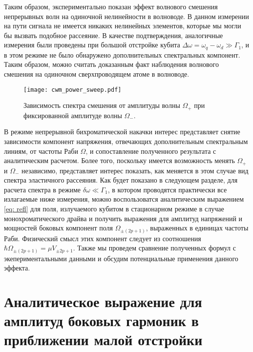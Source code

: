 Таким образом, экспериментально показан эффект волнового смешения непрерывных волн на одиночной нелинейности в волноводе. В данном измерении на пути сигнала не имеется никаких нелинейных элементов, которые мы могли бы вызвать подобное рассеяние. В качестве подтверждения, аналогичные измерения были проведены при большой отстройке кубита $\Delta\omega = \omega_q - \omega_d \gg \Gamma_1 $, и в этом режиме не было обнаружено дополнительных спектральных компонент. Таким образом, можно считать доказанным факт наблюдения волнового смешения на одиночном сверхпроводящем атоме в волноводе.  
\begin{figure}
	\centering
	\texttt{[image: cwm\_power\_sweep.pdf]}
	\caption[Зависимость спектра смешения от амплитуды волны $\Omega_+$ при фиксированной амплитуде волны $\Omega_-$. ]{Зависимость спектра смешения от амплитуды волны $\Omega_+$ при фиксированной амплитуде волны $\Omega_-$.}
	\label{fig: cw_power_sweep}
\end{figure}
В режиме непрерывной бихроматической накачки интерес представляет снятие зависимости компонент напряжения, отвечающих дополнительным спектральным линиям, от частоты Раби $\Omega$, и сопоставление  полученного результата с аналитическим расчетом. Более того, поскольку имеется возможность менять $\Omega_+$ и $\Omega_-$ независимо, представляет интерес показать, как меняется в этом случае вид спектра эластичного рассеяния. Как будет показано в следующем разделе, для расчета спектра в режиме $\delta\omega \ll \Gamma_1$, в котором проводятся практически все излагаемые ниже измерения, можно воспользоватся аналитическим выражением \eqref{eq: refl} для поля, излучаемого кубитом в стационарном режиме в случае монохроматического драйва и получить выражения для амплитуд напряжений и мощностей боковых компонент поля $\Omega_{\pm(2p+1)}$, выраженных в единицах частоты Раби. Физический смысл этих компонент следует из соотношения $\hbar\Omega_{\pm(2p+1)} = \mu V_{\pm{2p+1}}$. Также мы проведем сравнение полученных формул с экепериментальными данными и обсудим потенциальные применения данного эффекта.

\section{Аналитическое выражение для амплитуд боковых гармоник в приближении малой отстройки}
\label{sec: anal_sol}

